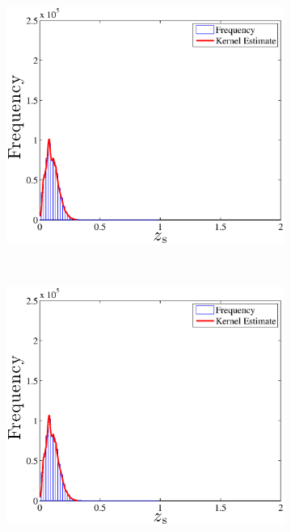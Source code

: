 \documentclass[useAMS,usenatbib,fleqn]{mn2e}
\begin{document}
\begin{figure}
        \centering
        \begin{subfigure}[b]{0.45\textwidth}
                \includegraphics[width=\textwidth]{figures/zspec_sdss_cut.eps}
        \end{subfigure}
        ~
        \begin{subfigure}[b]{0.45\textwidth}
                \includegraphics[width=\textwidth]{figures/zspec_boss_cut.eps}
        \end{subfigure}


\end{figure}
\end{document}
